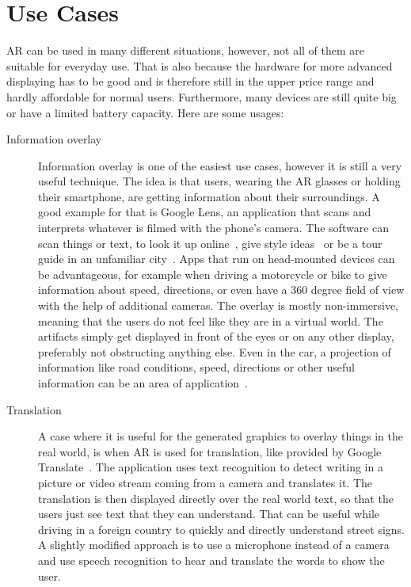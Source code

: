 \section{Use Cases}
AR can be used in many different situations, however, not all of them are suitable for everyday use. That is also because the hardware for more advanced displaying has to be good and is therefore still in the upper price range and hardly affordable for normal users. Furthermore, many devices are still quite big or have a limited battery capacity. Here are some usages:
\begin{description}
	\item[Information overlay]  
	Information overlay is one of the easiest use cases, however it is still a very useful technique. The idea is that users, wearing the AR glasses or holding their smartphone, are getting information about their surroundings. A good example for that is Google Lens, an application that scans and interprets whatever is filmed with the phone's camera. The software can scan things or text, to look it up online~\cite{patel18}, give style ideas~\cite{schaefer19} or be a tour guide in an unfamiliar city~\cite{malczyk19}. Apps that run on head-mounted devices can be advantageous, for example when driving a motorcycle or bike to give information about speed, directions, or even have a 360 degree field of view with the help of additional cameras. \newline
	The overlay is mostly non-immersive, meaning that the users do not feel like they are in a virtual  world. The artifacts simply get displayed in front of the eyes or on any other display, preferably not obstructing anything else. Even in the car, a projection of information like road conditions, speed, directions or other useful information can be an area of application~\cite{wayray}.
	\item[Translation]
	A case where it is useful for the generated graphics to overlay things in the real world, is when AR is used for translation, like provided by Google Translate~\cite{gu19}. The application uses text recognition to detect writing in a picture or video stream coming from a camera and translates it. The translation is then displayed directly over the real world text, so that the users just see text that they can understand. That can be useful while driving in a foreign country to quickly and directly understand street signs. A slightly modified approach is to use a microphone instead of a camera and use speech recognition to hear and translate the words to show the user.

\end{description}
